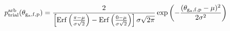 \documentclass[12pt]{article}
\begin{document}
\begin{displaymath}
p_{\rm trial}^{\rm arb}(\theta_{\rm g_a,f,p}) = 
{
{2}
\over
{
\left[
{\rm Erf}\left({{\pi-\mu}\over{\sigma \sqrt{2}}}\right)
- {\rm Erf}\left({{0-\mu}\over{\sigma \sqrt{2}}}\right)
\right]
\sigma \sqrt{2 \pi}
}
}
\exp\left(-{{(\theta_{\rm g_a,f,p} - \mu)^2}\over{2 \sigma^2}}\right)
\end{displaymath}
\end{document}
